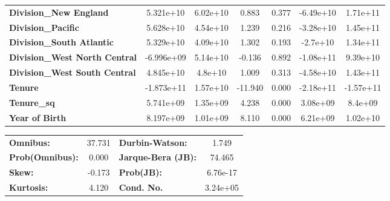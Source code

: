 \begin{center}
\begin{tabular}{lcccccc}
\textbf{Division\_New England}        &    5.321e+10  &     6.02e+10     &     0.883  &         0.377        &    -6.49e+10    &     1.71e+11     \\
\textbf{Division\_Pacific}            &    5.628e+10  &     4.54e+10     &     1.239  &         0.216        &    -3.28e+10    &     1.45e+11     \\
\textbf{Division\_South Atlantic}     &    5.329e+10  &     4.09e+10     &     1.302  &         0.193        &     -2.7e+10    &     1.34e+11     \\
\textbf{Division\_West North Central} &   -6.996e+09  &     5.14e+10     &    -0.136  &         0.892        &    -1.08e+11    &     9.39e+10     \\
\textbf{Division\_West South Central} &    4.845e+10  &      4.8e+10     &     1.009  &         0.313        &    -4.58e+10    &     1.43e+11     \\
\textbf{Tenure}                       &   -1.873e+11  &     1.57e+10     &   -11.940  &         0.000        &    -2.18e+11    &    -1.57e+11     \\
\textbf{Tenure\_sq}                   &    5.741e+09  &     1.35e+09     &     4.238  &         0.000        &     3.08e+09    &      8.4e+09     \\
\textbf{Year of Birth}                &    8.197e+09  &     1.01e+09     &     8.110  &         0.000        &     6.21e+09    &     1.02e+10     \\
\bottomrule
\end{tabular}
\begin{tabular}{lclc}
\textbf{Omnibus:}       & 37.731 & \textbf{  Durbin-Watson:     } &    1.749  \\
\textbf{Prob(Omnibus):} &  0.000 & \textbf{  Jarque-Bera (JB):  } &   74.465  \\
\textbf{Skew:}          & -0.173 & \textbf{  Prob(JB):          } & 6.76e-17  \\
\textbf{Kurtosis:}      &  4.120 & \textbf{  Cond. No.          } & 3.24e+05  \\
\bottomrule
\end{tabular}
\end{center}
